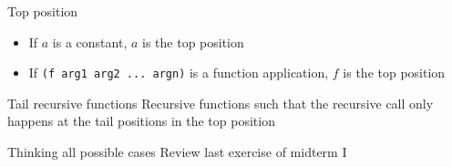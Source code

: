 \documentclass{beamer}
\begin{document}
\begin{frame}[fragile]{Top position}
  \begin{itemize}
  \item If $a$ is a constant, $a$ is the top position
  \item If \verb|(f arg1 arg2 ... argn)| is a function application, $f$ is the
    top position
  \end{itemize}
\end{frame}

\begin{frame}[fragile]{Tail recursive functions}
  Recursive functions such that the recursive call only happens at the tail
  positions in the top position
\end{frame}

\begin{frame}[fragile]{Thinking all possible cases}
  Review last exercise of midterm I
\end{frame}

\end{document}
